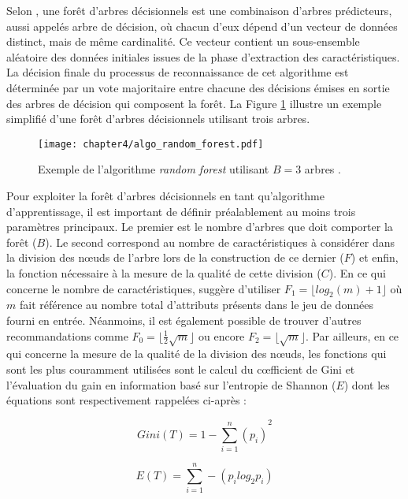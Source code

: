 Selon \cite{Breiman2001}, une forêt d'arbres décisionnels est une combinaison d'arbres prédicteurs, aussi appelés arbre de décision, où chacun d'eux dépend d'un vecteur de données distinct, mais de même cardinalité. Ce vecteur contient un sous-ensemble aléatoire des données initiales issues de la phase d'extraction des caractéristiques. La décision finale du processus de reconnaissance de cet algorithme est déterminée par un vote majoritaire entre chacune des décisions émises en sortie des arbres de décision qui composent la forêt. La Figure \ref{fig:algo_random_forest} illustre un exemple simplifié d'une forêt d'arbres décisionnels utilisant trois arbres.

\begin{figure}[H]
	\centering
	\texttt{[image: chapter4/algo\_random\_forest.pdf]}
  \caption[Exemple de l'algorithme \textit{random forest} utilisant $B=3$ arbres.]{Exemple de l'algorithme \textit{random forest} utilisant $B=3$ arbres \citep{Thullier2017}.}
	\label{fig:algo_random_forest}
\end{figure}

Pour exploiter la forêt d'arbres décisionnels en tant qu'algorithme d'apprentissage, il est important de définir préalablement au moins trois paramètres principaux. Le premier est le nombre d'arbres que doit comporter la forêt ($B$). Le second correspond au nombre de caractéristiques à considérer dans la division des n\oe{}uds de l'arbre lors de la construction de ce dernier ($F$) et enfin, la fonction nécessaire à la mesure de la qualité de cette division ($C$). En ce qui concerne le nombre de caractéristiques, \citeauthor{Breiman2001} suggère d'utiliser $F_1=\lfloor log_2(m) + 1\rfloor$ où $m$ fait référence au nombre total d'attributs présents dans le jeu de données fourni en entrée. Néanmoins, il est également possible de trouver d'autres recommandations comme $F_0=\lfloor \frac{1}{2}\sqrt{m}\rfloor$ ou encore $F_2=\lfloor \sqrt{m}\rfloor$. Par ailleurs, en ce qui concerne la mesure de la qualité de la division des n\oe{}uds, les fonctions qui sont les plus couramment utilisées sont le calcul du c\oe{}fficient de Gini et l'évaluation du gain en information basé sur l'entropie de Shannon ($E$) dont les équations sont respectivement rappelées ci-après :

\begin{equation}
	\label{eq:gini}
	Gini(T) = {1-\sum_{i=1}^{n}(p_i)}^2
\end{equation}

\begin{equation}
	\label{eq:gain}
	E(T) = \sum_{i=1}^{n}-(p_i log_2 p_i)
\end{equation}

